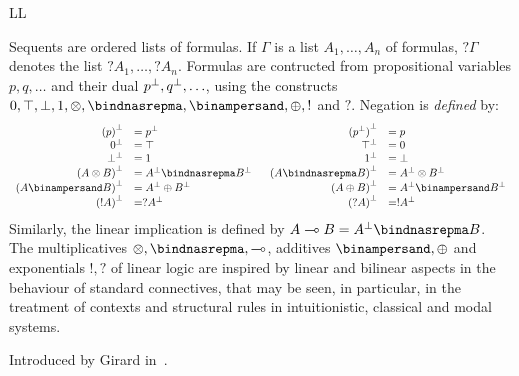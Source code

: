 \begin{entry}{LL}
\begin{calculus}
\end{calculus}


\begin{clarifications}
  Sequents are ordered lists of formulas.
  If $\Gamma$ is a list $A_1, \ldots, A_n$ of formulas, $?\Gamma$ denotes the list $?A_1, \ldots, ?A_n$.
  Formulas are contructed from propositional variables $p, q, \ldots$
  and their dual ${p}^\bot, {q}^\bot, \ldots$, using the constructs
  $\llzero, \top, \bot, \llone, \mathord{\llmconj}, \mathord{\llmdisj},
  \mathord{\llaconj}, \mathord{\lladisj}, \mathord{!}$ and $\mathord{?}$.
  Negation is \emph{defined} by:
  \[
  \begin{array}{rlrl}
    \llneg{(p)} &= \llneg{p} ~&~ \llneg{(\llneg{p})} &= p \\
    \llneg{\llzero} &= \top ~&~ \llneg{\top} &= \llzero \\
    \llneg{\bot} &= \llone ~&~ \llneg{\llone} &= \bot \\
    \llneg{(A \llmconj B)} &= \llneg{A} \llmdisj \llneg{B} ~&~
    \llneg{(A \llmdisj B)} &= \llneg{A} \llmconj \llneg{B} \\
    \llneg{(A \llaconj B)} &= \llneg{A} \lladisj \llneg{B} ~&~
    \llneg{(A \lladisj B)} &= \llneg{A} \llaconj \llneg{B} \\
    \llneg{(!A)} &= ?\llneg{A} ~&~ \llneg{(?A)} &= !\llneg{A} \\
  \end{array}
  \]
  Similarly, the linear implication is defined by $A \llimp B = \llneg{A} \llmdisj B$.
  The multiplicatives $\mathord{\llmconj}, \mathord{\llmdisj}, \mathord{\llimp}$,
  additives $\mathord{\llaconj}, \mathord{\lladisj}$
  and exponentials $\mathord{!}, \mathord{?}$ of linear logic
  are inspired by linear and bilinear aspects in the behaviour of standard connectives,
  that may be seen, in particular, in the treatment of contexts and structural rules 
  in intuitionistic, classical and modal systems.
\end{clarifications}

\begin{history}
  Introduced by Girard in~\cite{girard1987tcs}.
\end{history}



\end{entry}
